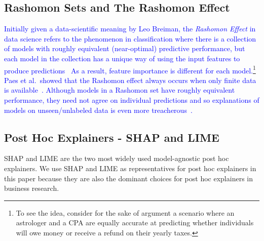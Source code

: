 \documentclass[mnsc,blindrev]{informs3}
\begin{document}
    \subsection{Rashomon Sets and The Rashomon Effect}
        \textcolor{blue}{Initially given a data-scientific meaning by Leo Breiman, the \emph{Rashomon Effect} in data science refers to the phenomenon in classification where there is a collection of models with roughly equivalent (near-optimal) predictive performance, but each model in the collection has a unique way of using the input features to produce predictions~\cite{donnelly2023rashomon,rudin2024amazingthingscomehaving} As a result, feature importance is different for each model.\footnote{To see the idea, consider for the sake of argument a scenario where an astrologer and a CPA are equally accurate at predicting whether individuals will owe money or receive a refund on their yearly taxes.} Paes et al.~showed that the Rashomon effect always occurs when only finite data is available~\cite{paes23inevitable}. Although  models in a Rashomon set have roughly equivalent performance, they need not agree on individual predictions and so explanations of models on unseen/unlabeled data is even more treacherous~\cite{hsu2022rashomon}. }  

    \subsection{Post Hoc Explainers - SHAP and LIME}
     SHAP \citep{lundberg17shap} and LIME \citep{ribeiro16lime}  are the two most widely used model-agnostic post hoc explainers. %
        We use SHAP and LIME as representatives for post hoc explainers in this paper because they are also the dominant choices for post hoc explainers in business research.

        
\end{document}
